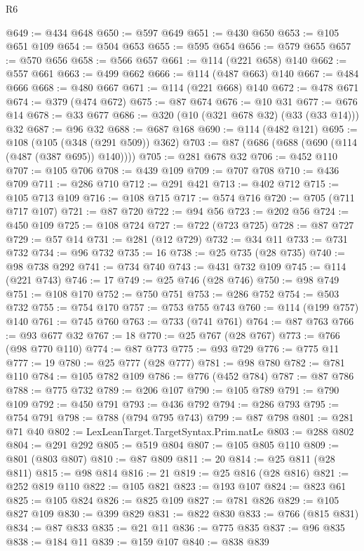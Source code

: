 \begin{lexlean}{R6}
\begin{coremodule}
@649 := @434 @648
@650 := @597 @649
@651 := @430 @650
@653 := @105 @651 @109
@654 := @504 @653
@655 := @595 @654
@656 := @579 @655
@657 := @570 @656
@658 := @566 @657
@661 := @114 (@221 @658) @140
@662 := @557 @661
@663 := @499 @662
@666 := @114 (@487 @663) @140
@667 := @484 @666
@668 := @480 @667
@671 := @114 (@221 @668) @140
@672 := @478 @671
@674 := @379 (@474 @672)
@675 := @87 @674
@676 := @10 @31
@677 := @676 @14
@678 := @33 @677
@686 := @320 (@10 (@321 @678 @32) (@33 (@33 @14))) @32
@687 := @96 @32
@688 := @687 @168
@690 := @114 (@482 @121)
@695 := @108 (@105 (@348 (@291 @509)) @362)
@703 := @87 (@686 (@688 (@690 (@114 (@487 (@387 @695)) @140))))
@705 := @281 @678 @32
@706 := @452 @110
@707 := @105 @706
@708 := @439 @109
@709 := @707 @708
@710 := @436 @709
@711 := @286 @710
@712 := @291 @421
@713 := @402 @712
@715 := @105 @713 @109
@716 := @108 @715
@717 := @574 @716
@720 := @705 (@711 @717 @107)
@721 := @87 @720
@722 := @94 @56
@723 := @202 @56
@724 := @450 @109
@725 := @108 @724
@727 := @722 (@723 @725)
@728 := @87 @727
@729 := @57 @14
@731 := @281 (@12 @729)
@732 := @34 @11
@733 := @731 @732
@734 := @96 @732
@735 := 16
@738 := @25 @735 (@28 @735)
@740 := @98 @738 @292
@741 := @734 @740
@743 := @431 @732 @109
@745 := @114 (@221 @743)
@746 := 17
@749 := @25 @746 (@28 @746)
@750 := @98 @749
@751 := @108 @170
@752 := @750 @751
@753 := @286 @752
@754 := @503 @732
@755 := @754 @170
@757 := @753 @755 @743
@760 := @114 (@199 @757) @140
@761 := @745 @760
@763 := @733 (@741 @761)
@764 := @87 @763
@766 := @93 @677 @32
@767 := 18
@770 := @25 @767 (@28 @767)
@773 := @766 (@98 @770 @110)
@774 := @87 @773
@775 := @93 @729
@776 := @775 @11
@777 := 19
@780 := @25 @777 (@28 @777)
@781 := @98 @780
@782 := @781 @110
@784 := @105 @782 @109
@786 := @776 (@452 @784)
@787 := @87 @786
@788 := @775 @732
@789 := @206 @107
@790 := @105 @789
@791 := @790 @109
@792 := @450 @791
@793 := @436 @792
@794 := @286 @793
@795 := @754 @791
@798 := @788 (@794 @795 @743)
@799 := @87 @798
@801 := @281 @71 @40
@802 := LexLeanTarget.TargetSyntax.Prim.natLe
@803 := @288 @802
@804 := @291 @292
@805 := @519 @804
@807 := @105 @805 @110
@809 := @801 (@803 @807)
@810 := @87 @809
@811 := 20
@814 := @25 @811 (@28 @811)
@815 := @98 @814
@816 := 21
@819 := @25 @816 (@28 @816)
@821 := @252 @819 @110
@822 := @105 @821
@823 := @193 @107
@824 := @823 @61
@825 := @105 @824
@826 := @825 @109
@827 := @781 @826
@829 := @105 @827 @109
@830 := @399 @829
@831 := @822 @830
@833 := @766 (@815 @831)
@834 := @87 @833
@835 := @21 @11
@836 := @775 @835
@837 := @96 @835
@838 := @184 @11
@839 := @159 @107
@840 := @838 @839

\end{coremodule}
\end{lexlean}
